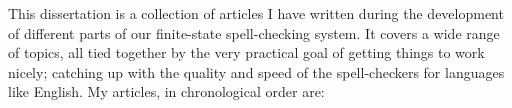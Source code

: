 \documentclass[officiallayout,draft]{unihelcompling}
\begin{document}
This dissertation is a collection of articles I have written during the
development of different parts of our finite-state spell-checking system. It
covers a wide range of topics, all tied together by the very practical goal of
getting things to work nicely; catching up with the quality and speed of the
spell-checkers for languages like English. My articles, in chronological order
are:

\end{document}
